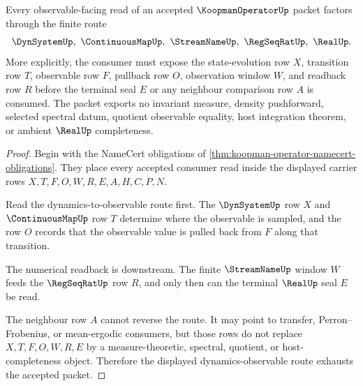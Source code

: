 \begin{theorem}
\label{thm:koopman-operator-dynamics-observable-route}
Every observable-facing read of an accepted $\KoopmanOperatorUp$ packet factors through the finite route
$$
\DynSystemUp,\ \ContinuousMapUp,\ \StreamNameUp,\ \RegSeqRatUp,\ \RealUp .
$$
More explicitly, the consumer must expose the state-evolution row $X$, transition row $T$, observable row $F$, pullback row $O$, observation window $W$, and readback row $R$ before the terminal seal $E$ or any neighbour comparison row $A$ is consumed. The packet exports no invariant measure, density pushforward, selected spectral datum, quotient observable equality, host integration theorem, or ambient $\RealUp$ completeness.
\end{theorem}
\begin{proof}
Begin with the NameCert obligations of \autoref{thm:koopman-operator-namecert-obligations}. They place every accepted consumer read inside the displayed carrier rows $X,T,F,O,W,R,E,A,H,C,P,N$.

Read the dynamics-to-observable route first. The $\DynSystemUp$ row $X$ and $\ContinuousMapUp$ row $T$ determine where the observable is sampled, and the row $O$ records that the observable value is pulled back from $F$ along that transition.

The numerical readback is downstream. The finite $\StreamNameUp$ window $W$ feeds the $\RegSeqRatUp$ row $R$, and only then can the terminal $\RealUp$ seal $E$ be read.

The neighbour row $A$ cannot reverse the route. It may point to transfer, Perron--Frobenius, or mean-ergodic consumers, but those rows do not replace $X,T,F,O,W,R,E$ by a measure-theoretic, spectral, quotient, or host-completeness object. Therefore the displayed dynamics-observable route exhausts the accepted packet.
\end{proof}




